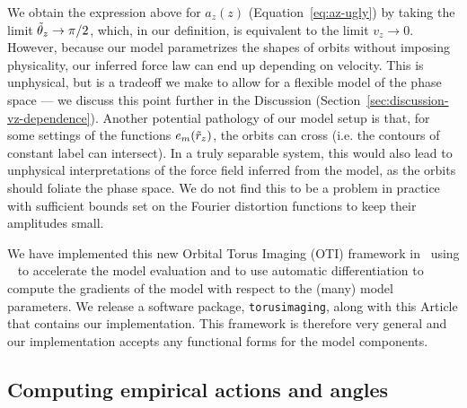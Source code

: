 We obtain the expression above for $a_z(z)$ (Equation~\ref{eq:az-ugly}) by taking the
limit $\tilde{\theta}_z \rightarrow \pi/2$, which, in our definition, is equivalent to the limit
$v_z \rightarrow 0$.
However, because our model parametrizes the shapes of orbits without imposing
physicality, our inferred force law can end up depending on velocity.
This is unphysical, but is a tradeoff we make to allow for a flexible model of the phase
space --- we discuss this point further in the Discussion
(Section~\ref{sec:discussion-vz-dependence}).
Another potential pathology of our model setup is that, for some settings of the
functions $e_m(\tilde{r}_z)$, the orbits can cross (i.e. the contours of constant label can
intersect).
In a truly separable system, this would also lead to unphysical interpretations of the
force field inferred from the model, as the orbits should foliate the phase space.
We do not find this to be a problem in practice with sufficient bounds set on the
Fourier distortion functions to keep their amplitudes small.

We have implemented this new Orbital Torus Imaging (OTI) framework in \python\ using
\jax\ \citep{jax:2018} to accelerate the model evaluation and to use automatic
differentiation to compute the gradients of the model with respect to the (many) model
parameters.
We release a software package, \texttt{torusimaging}, along with this Article that
contains our implementation.
This framework is therefore very general and our implementation accepts any functional
forms for the model components.


\subsection{Computing empirical actions and angles}
\label{sec:empirical-aaf}

